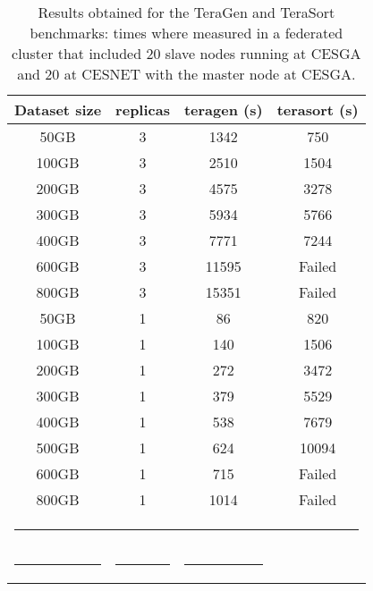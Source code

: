 \begin{table}[h!]
\caption{Results obtained for the TeraGen and TeraSort benchmarks: times where measured in a federated cluster that included 20 slave nodes running at CESGA and 20 at CESNET with the master node at CESGA.  }
\label{table:terasort}
%
\vspace{-0.5em}
%
\begin{center}
\begin{tabular}{cccc}
\toprule
Dataset size		& replicas & teragen (s)		& terasort (s) 	  \\
\midrule
50GB  & 3 & 1342 & 750 \\
100GB & 3 & 2510 & 1504 \\
200GB & 3 & 4575 & 3278 \\
300GB & 3 & 5934 & 5766 \\
400GB & 3 & 7771 & 7244 \\
600GB & 3 & 11595 & Failed \\
800GB & 3 & 15351 & Failed \\
50GB & 1 & 86 & 820 \\
100GB & 1 & 140 & 1506 \\
200GB & 1 & 272 & 3472 \\
300GB & 1 & 379 & 5529 \\
400GB & 1 & 538 & 7679 \\
500GB & 1 & 624 & 10094 \\
600GB & 1 & 715 & Failed \\
800GB & 1 & 1014 & Failed \\
%
\bottomrule
\multicolumn{4}{c}{\rule{0.98\textwidth}{0em}}\\
\rule{0.2\textwidth}{0cm} & \rule{0.2\textwidth}{0cm} & \rule{0.2\textwidth}{0cm} &   \\
\end{tabular}
\end{center}
\end{table}




